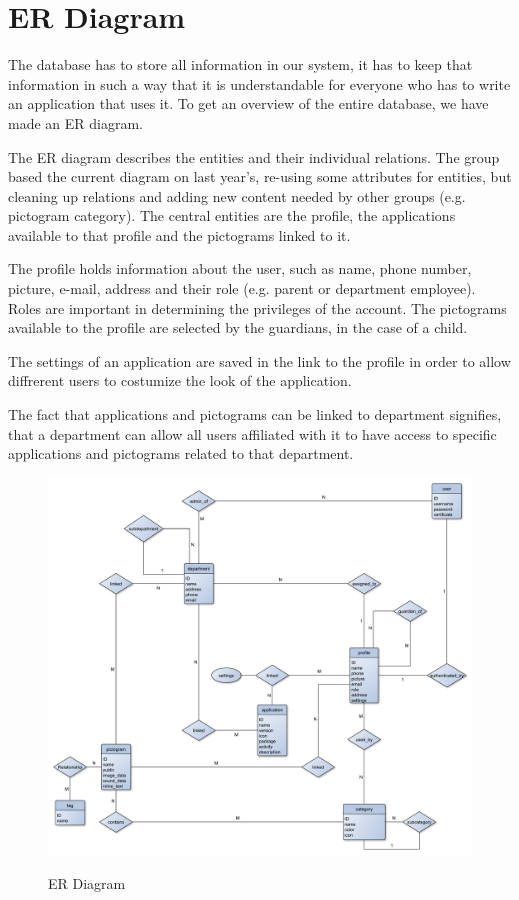 \section{ER Diagram}
The database has to store all information in our system, it has to keep that information in such a way that it is understandable for everyone who has to write an application that uses it. To get an overview of the entire database, we have made an ER diagram.

The ER diagram describes the entities and their individual relations. The group based the current diagram on last year's, re-using some attributes for entities, but cleaning up relations and adding new content needed by other groups (e.g. pictogram category). The central entities are the profile, the applications available to that profile and the pictograms linked to it.%

The profile holds information about the user, such as name, phone number, picture, e-mail, address and their role (e.g. parent or department employee). Roles are important in determining the privileges of the account. The pictograms available to the profile are selected by the guardians, in the case of a child.

The settings of an application are saved in the link to the profile in order to allow diffrerent users to costumize the look of the application.

The fact that applications and pictograms can be linked to department signifies, that a department can allow all users affiliated with it to have access to specific applications and pictograms related to that department.

\begin{figure}[h]
\includegraphics[width=\textwidth]{img/ER_diagram.pdf}
\label{fig:erdiagram}
\caption{ER Diagram}
\end{figure}